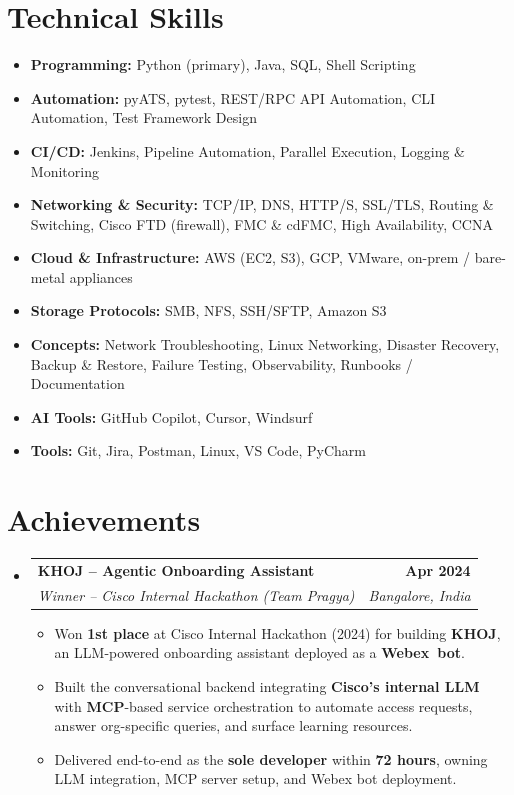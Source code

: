 \documentclass[letterpaper,11pt]{article}
\makeatletter
\newcommand{\resumeItem}[1]{
  \item\small{
    {#1 \vspace{-2pt}}
  }
}
\newcommand{\resumeSubheading}[4]{
  \vspace{-2pt}\item
    \begin{tabular*}{1.0\textwidth}[t]{l@{\extracolsep{\fill}}r}
      \textbf{\large#1} & \textbf{\small #2} \\
      \textit{\large#3} & \textit{\small #4} \\
     
    \end{tabular*}\vspace{-7pt}
}
\newcommand{\resumeSubHeadingListStart}{\begin{itemize}[leftmargin=0.0in, label={}]}
\newcommand{\resumeSubHeadingListEnd}{\end{itemize}}
\newcommand{\resumeItemListStart}{\begin{itemize}}
\newcommand{\resumeItemListEnd}{\end{itemize}\vspace{-5pt}}
\makeatother
\begin{document}
\section{Technical Skills}
\begin{itemize}[leftmargin=0.15in, label={}]
  \item \textbf{Programming:} Python (primary), Java, SQL, Shell Scripting
  \item \textbf{Automation:} pyATS, pytest, REST/RPC API Automation, CLI Automation, Test Framework Design
  \item \textbf{CI/CD:} Jenkins, Pipeline Automation, Parallel Execution, Logging \& Monitoring
  \item \textbf{Networking \& Security:} TCP/IP, DNS, HTTP/S, SSL/TLS, Routing \& Switching, Cisco FTD (firewall), FMC \& cdFMC, High Availability, CCNA
  \item \textbf{Cloud \& Infrastructure:} AWS (EC2, S3), GCP, VMware, on-prem / bare-metal appliances
  \item \textbf{Storage Protocols:} SMB, NFS, SSH/SFTP, Amazon S3
  \item \textbf{Concepts:} Network Troubleshooting, Linux Networking, Disaster Recovery, Backup \& Restore, Failure Testing, Observability, Runbooks / Documentation
  \item \textbf{AI Tools:} GitHub Copilot, Cursor, Windsurf
  \item \textbf{Tools:} Git, Jira, Postman, Linux, VS Code, PyCharm
\end{itemize}
\vspace{6pt}

\section{Achievements}
\resumeSubHeadingListStart
  \resumeSubheading
    {KHOJ -- Agentic Onboarding Assistant \href{https://github.com/Somasekhar9666/resume/blob/main/khoj-hackathon-winner.jpeg}{\raisebox{-0.1\height}\faExternalLink}}
    {Apr 2024}
    {Winner -- Cisco Internal Hackathon \textnormal{(Team Pragya)}}
    {Bangalore, India}
    \resumeItemListStart
      \resumeItem{Won \textbf{1st place} at Cisco Internal Hackathon (2024) for building \textbf{KHOJ}, an LLM-powered onboarding assistant deployed as a \textbf{Webex~bot}.}
      \resumeItem{Built the conversational backend integrating \textbf{Cisco's internal LLM} with \textbf{MCP}-based service orchestration to automate access requests, answer org-specific queries, and surface learning resources.}
      \resumeItem{Delivered end-to-end as the \textbf{sole developer} within \textbf{72 hours}, owning LLM integration, MCP server setup, and Webex bot deployment.}
    \resumeItemListEnd
\resumeSubHeadingListEnd
\vspace{6pt}
\end{document}
